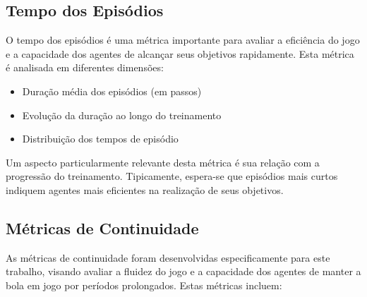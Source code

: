 


\subsection{Tempo dos Episódios}

O tempo dos episódios é uma métrica importante para avaliar a eficiência do jogo e a capacidade dos agentes de alcançar seus objetivos rapidamente. Esta métrica é analisada em diferentes dimensões:

\begin{itemize}
    \item Duração média dos episódios (em passos)
    \item Evolução da duração ao longo do treinamento
    \item Distribuição dos tempos de episódio
\end{itemize}

Um aspecto particularmente relevante desta métrica é sua relação com a progressão do treinamento. Tipicamente, espera-se que episódios mais curtos indiquem agentes mais eficientes na realização de seus objetivos.

\subsection{Métricas de Continuidade}

As métricas de continuidade foram desenvolvidas especificamente para este trabalho, visando avaliar a fluidez do jogo e a capacidade dos agentes de manter a bola em jogo por períodos prolongados. Estas métricas incluem:

